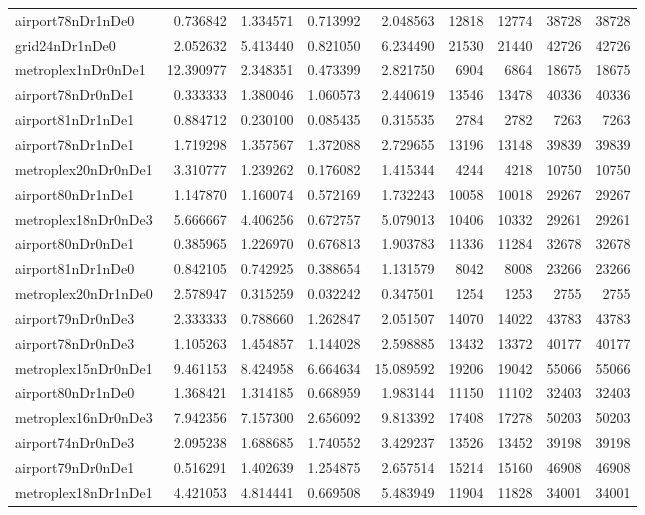 \begin{longtable}{|l|r|r|r|r|r|r|r|r|}
airport78nDr1nDe0 & 0.736842 & 1.334571 & 0.713992 & 2.048563 & 12818 & 12774 & 38728 & 38728 \\
grid24nDr1nDe0 & 2.052632 & 5.413440 & 0.821050 & 6.234490 & 21530 & 21440 & 42726 & 42726 \\
metroplex1nDr0nDe1 & 12.390977 & 2.348351 & 0.473399 & 2.821750 & 6904 & 6864 & 18675 & 18675 \\
airport78nDr0nDe1 & 0.333333 & 1.380046 & 1.060573 & 2.440619 & 13546 & 13478 & 40336 & 40336 \\
airport81nDr1nDe1 & 0.884712 & 0.230100 & 0.085435 & 0.315535 & 2784 & 2782 & 7263 & 7263 \\
airport78nDr1nDe1 & 1.719298 & 1.357567 & 1.372088 & 2.729655 & 13196 & 13148 & 39839 & 39839 \\
metroplex20nDr0nDe1 & 3.310777 & 1.239262 & 0.176082 & 1.415344 & 4244 & 4218 & 10750 & 10750 \\
airport80nDr1nDe1 & 1.147870 & 1.160074 & 0.572169 & 1.732243 & 10058 & 10018 & 29267 & 29267 \\
metroplex18nDr0nDe3 & 5.666667 & 4.406256 & 0.672757 & 5.079013 & 10406 & 10332 & 29261 & 29261 \\
airport80nDr0nDe1 & 0.385965 & 1.226970 & 0.676813 & 1.903783 & 11336 & 11284 & 32678 & 32678 \\
airport81nDr1nDe0 & 0.842105 & 0.742925 & 0.388654 & 1.131579 & 8042 & 8008 & 23266 & 23266 \\
metroplex20nDr1nDe0 & 2.578947 & 0.315259 & 0.032242 & 0.347501 & 1254 & 1253 & 2755 & 2755 \\
airport79nDr0nDe3 & 2.333333 & 0.788660 & 1.262847 & 2.051507 & 14070 & 14022 & 43783 & 43783 \\
airport78nDr0nDe3 & 1.105263 & 1.454857 & 1.144028 & 2.598885 & 13432 & 13372 & 40177 & 40177 \\
metroplex15nDr0nDe1 & 9.461153 & 8.424958 & 6.664634 & 15.089592 & 19206 & 19042 & 55066 & 55066 \\
airport80nDr1nDe0 & 1.368421 & 1.314185 & 0.668959 & 1.983144 & 11150 & 11102 & 32403 & 32403 \\
metroplex16nDr0nDe3 & 7.942356 & 7.157300 & 2.656092 & 9.813392 & 17408 & 17278 & 50203 & 50203 \\
airport74nDr0nDe3 & 2.095238 & 1.688685 & 1.740552 & 3.429237 & 13526 & 13452 & 39198 & 39198 \\
airport79nDr0nDe1 & 0.516291 & 1.402639 & 1.254875 & 2.657514 & 15214 & 15160 & 46908 & 46908 \\
metroplex18nDr1nDe1 & 4.421053 & 4.814441 & 0.669508 & 5.483949 & 11904 & 11828 & 34001 & 34001 \\

\end{longtable}
